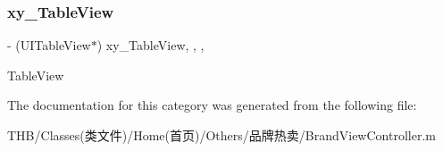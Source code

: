 \subsubsection{\texorpdfstring{xy\+\_\+\+Table\+View}{xy\_TableView}}
{\footnotesize\ttfamily -\/ (U\+I\+Table\+View$\ast$) xy\+\_\+\+Table\+View\hspace{0.3cm}{\ttfamily [read]}, {\ttfamily [write]}, {\ttfamily [nonatomic]}, {\ttfamily [strong]}}

Table\+View 

The documentation for this category was generated from the following file\+:\begin{DoxyCompactItemize}
\item 
T\+H\+B/\+Classes(类文件)/\+Home(首页)/\+Others/品牌热卖/Brand\+View\+Controller.\+m\end{DoxyCompactItemize}

